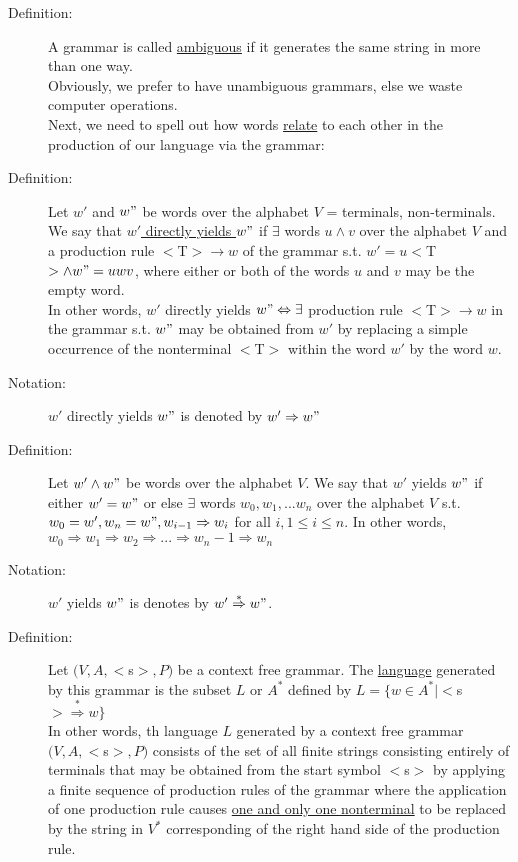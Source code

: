 \documentclass[10pt]{article}
\begin{document}
\begin{description}
\begin{enumerate}
		\end{enumerate}
		\item[Definition:] A grammar is called \underline{ambiguous} if it generates the same string in more than one way. \\
		Obviously, we prefer to have unambiguous grammars, else we waste computer operations. \\
		Next, we need to spell out how words \underline{relate} to each other in the production of our language via the grammar:
		\item[Definition:] Let $w'$ and $w"$ be words over the alphabet $V$ = {terminals, non-terminals}. We say that \underline{$w'$ directly yields $w"$} if $\exists$ words $u \land v$ over the alphabet $V$ and a production rule $<$T$>\rightarrow w$ of the grammar s.t. $w' = u<$T$>\land w" = uwv$, where either or both of the words $u$ and $v$ may be the empty word. \\
		In other words, $w'$ directly yields $w" \Leftrightarrow \exists$ production rule $<$T$>\rightarrow w$ in the grammar s.t. $w"$ may be obtained from $w'$ by replacing a simple occurrence of the nonterminal $<$T$>$ within the word $w'$ by the word $w$.
		\item[Notation:] $w'$ directly yields $w"$ is denoted by $w' \Rightarrow w"$
		\item[Definition:] Let $w' \land w"$ be words over the alphabet $V$. We say that $w'$ yields $w"$ if either $w'= w"$ or else $\exists$ words $w_0, w_1, ... w_n$ over the alphabet $V$ s.t. $w_0=w', w_n = w", w_{i-1} \Rightarrow w_i$ for all $i, 1 \leq i \leq n$. In other words, $w_0 \Rightarrow w_1 \Rightarrow w_2 \Rightarrow ... \Rightarrow w_n-1 \Rightarrow w_n$
		\item[Notation:] $w'$ yields $w"$ is denotes by $w' \overset{*}{\Rightarrow} w"$.
		\item[Definition:] Let $(V, A, <$s$>, P)$ be a context free grammar. The \underline{language} generated by this grammar is the subset $L$ or $A^*$ defined by $L = \{w \in A^* \mid <$s$>\overset{*}{\Rightarrow} w\}$ \\
		In other words, th language $L$ generated by a context free grammar $(V, A, <$s$>, P)$ consists of the set of all finite strings consisting entirely of terminals that may be obtained from the start symbol $<$s$>$ by applying a finite sequence of production rules of the grammar where the application of one production rule causes \underline{one and only one nonterminal} to be replaced by the string in $V^*$ corresponding of the right hand side of the production rule.
	\end{description}
	
\end{document}
